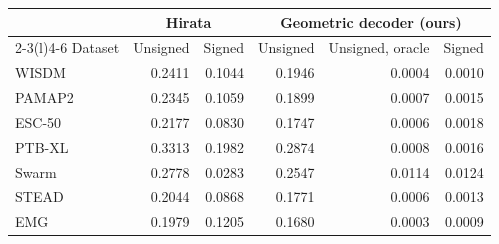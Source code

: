 \begin{tabular}{@{}lrrrrr@{}}
\toprule
& \multicolumn{2}{c}{Hirata} & \multicolumn{3}{c}{Geometric decoder (ours)} \\
\cmidrule(lr){2-3}\cmidrule(l){4-6}
Dataset & Unsigned & Signed & Unsigned & Unsigned, oracle & Signed \\
\midrule
WISDM & 0.2411 & 0.1044 & 0.1946 & 0.0004 & 0.0010 \\
PAMAP2 & 0.2345 & 0.1059 & 0.1899 & 0.0007 & 0.0015 \\
ESC-50 & 0.2177 & 0.0830 & 0.1747 & 0.0006 & 0.0018 \\
PTB-XL & 0.3313 & 0.1982 & 0.2874 & 0.0008 & 0.0016 \\
Swarm & 0.2778 & 0.0283 & 0.2547 & 0.0114 & 0.0124 \\
STEAD & 0.2044 & 0.0868 & 0.1771 & 0.0006 & 0.0013 \\
EMG & 0.1979 & 0.1205 & 0.1680 & 0.0003 & 0.0009 \\
\bottomrule
\end{tabular}
